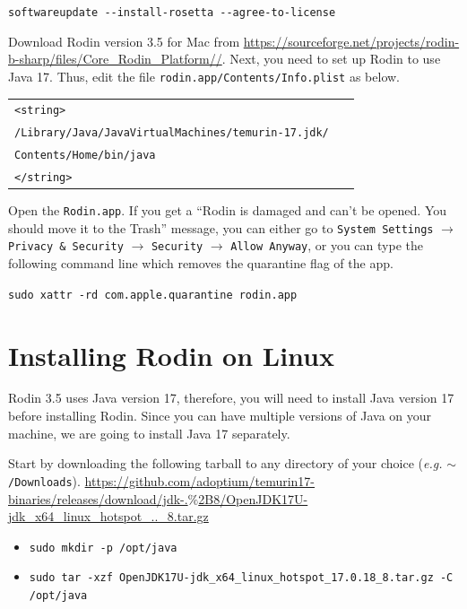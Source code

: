 \documentclass{article} %
\newcommand{\continuationR}{\rotatebox[origin=c]{-90}{$\curvearrowright$}}
\begin{document}
\medskip
\verb+softwareupdate --install-rosetta --agree-to-license+
\medskip

Download Rodin version 3.5 for Mac from \href{https://sourceforge.net/projects/rodin-b-sharp/files/Core_Rodin_Platform/3.5/} {https://\-source\-forge.\-net/\-pro\-jects/\-rodin\--b-\-sharp/\-files/\-Core\_\-Rodin\_\-Plat\-form//}. Next, you need to set up Rodin to use Java 17. Thus, edit the file \texttt{rodin.\-app/\-Contents/\-Info.\-plist} as below.

\medskip
\begin{tabular}{l}
\verb+<string>+\\
  \verb+/Library/Java/JavaVirtualMachines/temurin-17.jdk/+~~~\continuationR\\
  \quad\quad\quad\verb+Contents/Home/bin/java+\\
\verb+</string>+\\
\end{tabular}
\medskip

Open the \verb+Rodin.app+. If you get a ``Rodin is damaged and can't be opened. You should move it to the Trash'' message, you can either go to \texttt{System Settings} $\rightarrow$ \texttt{Privacy \& Security} $\rightarrow$ \texttt{Security} $\rightarrow$ \texttt{Allow Anyway}, or you can type the following command line which removes the quarantine flag of the app. 

\medskip
\verb+sudo xattr -rd com.apple.quarantine rodin.app+
\medskip



\section{Installing Rodin on Linux}
\label{sec_rodin_linux}
Rodin 3.5 uses Java version 17, therefore, you will need to install Java version 17 before installing Rodin. Since you can have multiple versions of Java on your machine, we are going to install Java 17 separately.

Start by downloading the following tarball to any directory of your choice (\emph{e.g.} \texttt{$\sim$/Downloads}). \href{https://github.com/adoptium/temurin17-binaries/releases/download/jdk-17.0.18%2B8/OpenJDK17U-jdk_x64_linux_hotspot_17.0.18_8.tar.gz} {https://\-github.\-com/\-adoptium/\-temurin17-\-binaries/\-releases/\-download/\-jdk-\-17.\-0.18$\%$2B8/\-OpenJDK17U-\-jdk\_\-x64\_\-linux\_\-hotspot\_\-17.\-0.\-18\_8.\-tar\-.gz} 

\begin{itemize}
    \item \texttt{sudo mkdir -p /opt/java}
    \item \texttt{sudo tar -xzf OpenJDK17U-jdk\_x64\_linux\_hotspot\_17.0.18\_8.tar.gz -C /opt/java}
\end{itemize}
\end{document}
